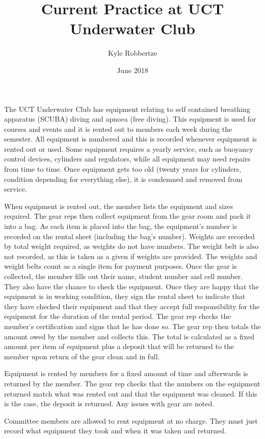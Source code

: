 \documentclass[12pt,a4paper]{article}
\begin{document}
\title{Current Practice at UCT Underwater Club}
\author{Kyle Robbertze}
\date{June 2018}
\maketitle

The UCT Underwater Club has equipment relating to self contained breathing
apparatus (SCUBA) diving and apnoea (free diving). This equipment is used for
courses and events and it is rented out to members each week during the
semester. All equipment is numbered and this is recorded whenever equipment is
rented out or used. Some equipment requires a yearly service, such as buoyancy
control devices, cylinders and regulators, while all equipment may need repairs
from time to time. Once equipment gets too old (twenty years for cylinders,
condition depending for everything else), it is condemned and removed from
service.

When equipment is rented out, the member lists the equipment and sizes required.
The gear reps then collect equipment from the gear room and pack it into a bag.
As each item is placed into the bag, the equipment's number is recorded on the
rental sheet (including the bag's number). Weights are recorded by total weight
required, as weights do not have numbers. The weight belt is also not recorded,
as this is taken as a given if weights are provided. The weights and weight
belts count as a single item for payment purposes. Once the gear is collected,
the member fills out their name, student number and cell number. They also have
the chance to check the equipment. Once they are happy that the equipment is in
working condition, they sign the rental sheet to indicate that they have checked
their equipment and that they accept full responsibility for the equipment for
the duration of the rental period. The gear rep checks the member's
certification and signs that he has done so. The gear rep then totals the amount
owed by the member and collects this. The total is calculated as a fixed amount
per item of equipment plus a deposit that will be returned to the member upon
return of the gear clean and in full.

Equipment is rented by members for a fixed amount of time and afterwards is
returned by the member. The gear rep checks that the numbers on the equipment
returned match what was rented out and that the equipment was cleaned. If this
is the case, the deposit is returned. Any issues with gear are noted.

Committee members are allowed to rent equipment at no charge. They must just record
what equipment they took and when it was taken and returned.
\end{document}
